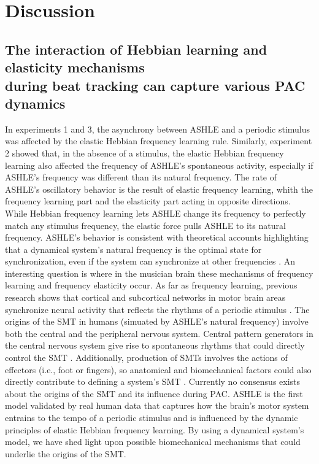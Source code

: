 \documentclass{report}
\begin{document}
\section{Discussion}

\subsection{The interaction of Hebbian learning and elasticity mechanisms \\ during beat tracking can capture various PAC dynamics}

In experiments 1 and 3, the asynchrony between ASHLE and a periodic stimulus was affected by the elastic Hebbian frequency learning rule. Similarly, experiment 2 showed that, in the absence of a stimulus, the elastic Hebbian frequency learning also affected the frequency of ASHLE's spontaneous activity, especially if ASHLE's frequency was different than its natural frequency. The rate of ASHLE's oscillatory behavior is the result of elastic frequency learning, whith the frequency learning part and the elasticity part acting in opposite directions. While Hebbian frequency learning lets ASHLE change its frequency to perfectly match any stimulus frequency, the elastic force pulls ASHLE to its natural frequency. ASHLE's behavior is consistent with theoretical accounts highlighting that a dynamical system's natural frequency is the optimal state for synchronization, even if the system can synchronize at other frequencies \cite{von1937nature, haken1985theoretical, kelso1997relative, scheurich2018tapping}. An interesting question is where in the musician brain these mechanisms of frequency learning and frequency elasticity occur. As far as frequency learning, previous research shows that cortical and subcortical networks in motor brain areas synchronize neural activity that reflects the rhythms of a periodic stimulus \cite{large2015neural, chen2008moving, grahn2009feeling, fujioka2012internalized}. The origins of the SMT in humans (simuated by ASHLE's natural frequency) involve both the central and the peripheral nervous system. Central pattern generators in the central nervous system give rise to spontaneous rhythms that could directly control the SMT \cite{latash1992virtual}. Additionally, production of SMTs involves the actions of effectors (i.e., foot or fingers), so anatomical and biomechanical factors could also directly contribute to defining a system's SMT \cite{goodman2000advantages}. Currently no consensus exists about the origins of the SMT and its influence during PAC. ASHLE is the first model validated by real human data that captures how the brain's motor system entrains to the tempo of a periodic stimulus and is influenced by the dynamic principles of elastic Hebbian frequency learning. By using a dynamical system's model, we have shed light upon possible biomechanical mechanisms that could underlie the origins of the SMT.
\end{document}
